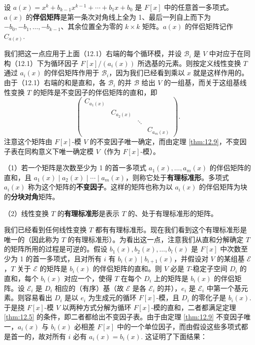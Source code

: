 \begin{definition}
设 \(a(x) = x^k+b_{k-1}x^{k-1}+\cdots+b_1x+b_0\) 是 \(F[x]\) 中的任意首一多项式。\(a(x)\) 的\textbf{伴侣矩阵}是第一条次对角线上全为 1、最后一列自上而下为 \(-b_0, -b_1, \ldots, -b_{k-1}\)、其余位置全为零的 \(k \times k\) 矩阵。\(a(x)\) 的伴侣矩阵记作 \(C_{a(x)}\).
\end{definition}

我们把这一点应用于上面（12.1）右端的每个循环模，并设 \(\mathcal{B}_i\) 是 \(V\) 中对应于在同构（12.1）下为循环因子 \(F[x]/(a_i(x))\) 所选基的元素。则按定义线性变换 \(T\) 通过 \(a_i(x)\) 的伴侣矩阵作用于 \(\mathcal{B}_i\)，因为我们已经看到乘以 \(x\) 就是这样作用的。由于（12.1）右端的和是直和，各 \(\mathcal{B}_i\) 的并 \(\mathcal{B}\) 给出 \(V\) 的一组基，而关于这组基线性变换 \(T\) 的矩阵是不变因子的伴侣矩阵的直和，即
\begin{equation}
\begin{pmatrix} C_{a_1(x)} & & & \\ & C_{a_2(x)} & & \\ & & \ddots & \\ & & & C_{a_m(x)} \end{pmatrix}. \tag{12.2}
\end{equation}
注意这个矩阵由 \(F[x]\)-模 \(V\) 的不变因子唯一确定，而由定理 \ref{thm:12.9}，不变因子表在同构意义下唯一确定模 \(V\)（作为 \(F[x]\)-模）。

\begin{definition}
（1）若一个矩阵是次数至少为 1 的首一多项式 \(a_1(x), \ldots, a_m(x)\) 的伴侣矩阵的直和，且 \(a_1(x) \mid a_2(x) \mid \cdots \mid a_m(x)\)，则称它处于\textbf{有理标准形}。多项式 \(a_i(x)\) 称为这个矩阵的\textbf{不变因子}。这样的矩阵也称为以 \(a_i(x)\) 的伴侣矩阵为块的\textbf{分块对角}矩阵。

（2）线性变换 \(T\) 的\textbf{有理标准形}是表示 \(T\) 的、处于有理标准形的矩阵。
\end{definition}

我们已经看到任何线性变换 \(T\) 都有有理标准形。现在我们看到这个有理标准形是唯一的（因此称为 \(T\) 的有理标准形）。为看出这一点，注意我们从直和分解确定 \(T\) 的矩阵所用的过程是可逆的。假设 \(b_1(x), b_2(x), \ldots, b_l(x)\) 是 \(F[x]\) 中次数至少为 1 的首一多项式，且对所有 \(i\) 有 \(b_i(x) \mid b_{i+1}(x)\)，并假设对 \(V\) 的某组基 \(\mathcal{E}\)，\(T\) 关于 \(\mathcal{E}\) 的矩阵是 \(b_i(x)\) 的伴侣矩阵的直和。则 \(V\) 必是 \(T\)-稳定子空间 \(D_i\) 的直和，每个 \(b_i(x)\) 对应一个，使得 \(T\) 在每个 \(D_i\) 上的矩阵是 \(b_i(x)\) 的伴侣矩阵。设 \(\mathcal{E}_i\) 是 \(D_i\) 相应的（有序）基（故 \(\mathcal{E}\) 是各 \(\mathcal{E}_i\) 的并），\(e_i\) 是 \(\mathcal{E}_i\) 中第一个基元素。则容易看出 \(D_i\) 是以 \(e_i\) 为生成元的循环 \(F[x]\)-模，且 \(D_i\) 的零化子是 \(b_i(x)\). 于是挠 \(F[x]\)-模 \(V\) 以两种方式分解为循环 \(F[x]\)-模的直和，二者都满足定理 \ref{thm:12.5} 的条件，即二者都给出不变因子表。由于由定理 \ref{thm:12.9} 不变因子唯一，\(a_i(x)\) 与 \(b_i(x)\) 必相差 \(F[x]\) 中的一个单位因子，而由假设这些多项式都是首一的，故对所有 \(i\) 必有 \(a_i(x) = b_i(x)\). 这证明了下面结果：

